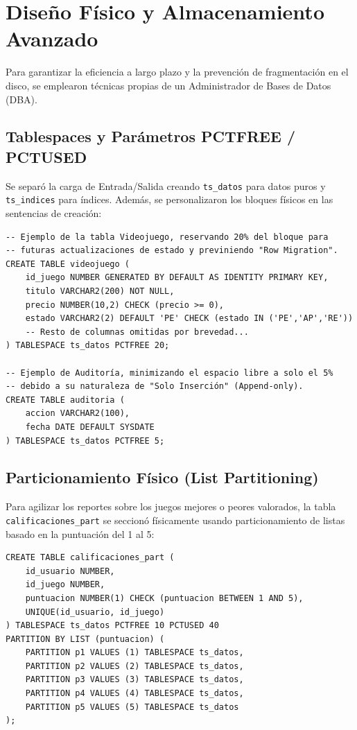\documentclass[12pt,a4paper]{article}
\begin{document}
\section{Diseño Físico y Almacenamiento Avanzado}
Para garantizar la eficiencia a largo plazo y la prevención de fragmentación en el disco, se emplearon técnicas propias de un Administrador de Bases de Datos (DBA).

\subsection{Tablespaces y Parámetros PCTFREE / PCTUSED}
Se separó la carga de Entrada/Salida creando \texttt{ts\_datos} para datos puros y \texttt{ts\_indices} para índices. Además, se personalizaron los bloques físicos en las sentencias de creación:

\begin{lstlisting}
-- Ejemplo de la tabla Videojuego, reservando 20% del bloque para 
-- futuras actualizaciones de estado y previniendo "Row Migration".
CREATE TABLE videojuego (
    id_juego NUMBER GENERATED BY DEFAULT AS IDENTITY PRIMARY KEY,
    titulo VARCHAR2(200) NOT NULL,
    precio NUMBER(10,2) CHECK (precio >= 0),
    estado VARCHAR2(2) DEFAULT 'PE' CHECK (estado IN ('PE','AP','RE'))
    -- Resto de columnas omitidas por brevedad...
) TABLESPACE ts_datos PCTFREE 20;

-- Ejemplo de Auditoría, minimizando el espacio libre a solo el 5% 
-- debido a su naturaleza de "Solo Inserción" (Append-only).
CREATE TABLE auditoria (
    accion VARCHAR2(100),
    fecha DATE DEFAULT SYSDATE
) TABLESPACE ts_datos PCTFREE 5;
\end{lstlisting}

\subsection{Particionamiento Físico (List Partitioning)}
Para agilizar los reportes sobre los juegos mejores o peores valorados, la tabla \texttt{calificaciones\_part} se seccionó físicamente usando particionamiento de listas basado en la puntuación del 1 al 5:

\begin{lstlisting}
CREATE TABLE calificaciones_part (
    id_usuario NUMBER,
    id_juego NUMBER,
    puntuacion NUMBER(1) CHECK (puntuacion BETWEEN 1 AND 5),
    UNIQUE(id_usuario, id_juego)
) TABLESPACE ts_datos PCTFREE 10 PCTUSED 40
PARTITION BY LIST (puntuacion) (
    PARTITION p1 VALUES (1) TABLESPACE ts_datos,
    PARTITION p2 VALUES (2) TABLESPACE ts_datos,
    PARTITION p3 VALUES (3) TABLESPACE ts_datos,
    PARTITION p4 VALUES (4) TABLESPACE ts_datos,
    PARTITION p5 VALUES (5) TABLESPACE ts_datos
);
\end{lstlisting}
\end{document}
